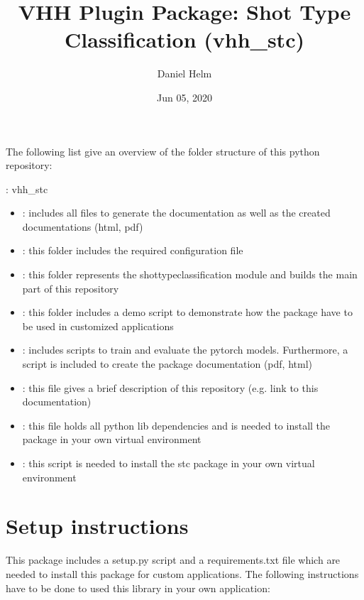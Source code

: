 \documentclass[letterpaper,10pt,english,openany,oneside]{sphinxmanual}
\title{VHH Plugin Package: Shot Type Classification (vhh\_stc)}
\date{Jun 05, 2020}
\author{Daniel Helm}
\begin{document}
\pagestyle{empty}
\sphinxmaketitle
\pagestyle{plain}
\sphinxtableofcontents
\pagestyle{normal}
\label{\detokenize{index::doc}}


The following list give an overview of the folder structure of this python repository:

: vhh\_stc
\begin{itemize}
\item {} 
: includes all files to generate the documentation as well as the created documentations (html, pdf)

\item {} 
: this folder includes the required configuration file

\item {} 
: this folder represents the shot\sphinxhyphen{}type\sphinxhyphen{}classification module and builds the main part of this repository

\item {} 
: this folder includes a demo script to demonstrate how the package have to be used in customized applications

\item {} 
: includes scripts to train and evaluate the pytorch models. Furthermore, a script is included to create the package documentation (pdf, html)

\item {} 
: this file gives a brief description of this repository (e.g. link to this documentation)

\item {} 
: this file holds all python lib dependencies and is needed to install the package in your own virtual environment

\item {} 
: this script is needed to install the stc package in your own virtual environment

\end{itemize}


\chapter{Setup  instructions}
\label{\detokenize{index:setup-instructions}}
This package includes a setup.py script and a requirements.txt file which are needed to install this package for custom applications.
The following instructions have to be done to used this library in your own application:
\end{document}
